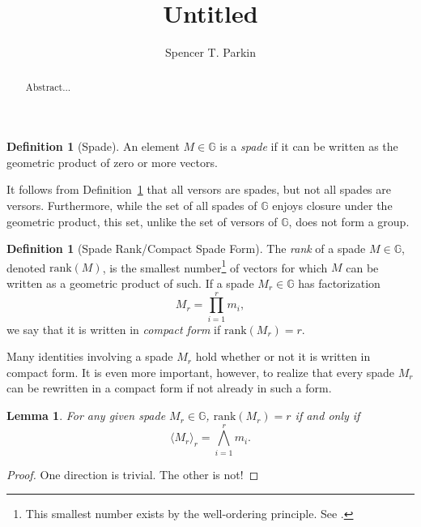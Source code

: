 \documentclass{birkjour}
\newtheorem{lem}[thm]{Lemma}
\theoremstyle{definition}
\newtheorem{defn}[thm]{Definition}
\theoremstyle{remark}
\numberwithin{equation}{section}
\newcommand{\G}{\mathbb{G}}
\newcommand{\rank}{\mbox{rank}}
\begin{document}
\title{Untitled}

\author{Spencer T. Parkin}



\begin{abstract}
Abstract...
\end{abstract}


\maketitle

\begin{defn}[Spade]\label{def_spade}
An element $M\in\G$ is a \emph{spade} if it can be written as the geometric
product of zero or more vectors.
\end{defn}

It follows from Definition~\ref{def_spade} that all versors are spades, but not all spades are versors.
Furthermore, while the set of all spades of $\G$ enjoys closure under the geometric product, this set,
unlike the set of versors of $\G$, does not form a group.

\begin{defn}[Spade Rank/Compact Spade Form]\label{def_spader_rank}
The \emph{rank} of a spade $M\in\G$, denoted $\rank(M)$, is the smallest number\footnote{This smallest number exists
by the well-ordering principle.  See \cite{}.} of vectors for which $M$ can
be written as a geometric product of such.  If a spade $M_r\in\G$ has factorization
\begin{equation*}
M_r=\prod_{i=1}^r m_i,
\end{equation*}
we say that it is written in \emph{compact form} if $\rank(M_r)=r$.
\end{defn}

Many identities involving a spade $M_r$ hold whether or not it is written in compact form.
It is even more important, however, to realize that every spade $M_r$ can be rewritten in a compact form
if not already in such a form.

\begin{lem}\label{lem_compact_lin_indep}
For any given spade $M_r\in\G$, $\rank(M_r)=r$ if and only if
\begin{equation*}
\langle M_r\rangle_r = \bigwedge_{i=1}^r m_i.
\end{equation*}
\end{lem}
\begin{proof}
One direction is trivial.  The other is not!
\end{proof}
\end{document}
